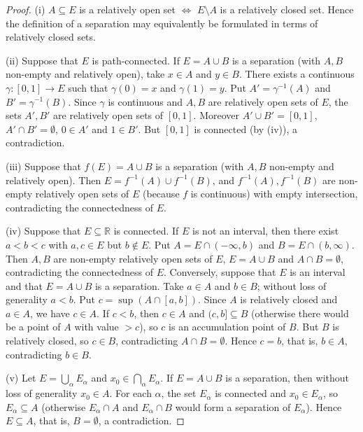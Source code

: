 \begin{proof}
(i) $A \subseteq E$ is a relatively open set $\iff$ $E \setminus A$ is a relatively closed set. Hence the definition of a separation may equivalently be formulated in terms of relatively closed sets.

(ii) Suppose that $E$ is path-connected. If $E = A \cup B$ is a separation (with $A, B$ non-empty and relatively open), take $x \in A$ and $y \in B$. There exists a continuous $\gamma: [0, 1] \to E$ such that $\gamma(0) = x$ and $\gamma(1) = y$. Put $A' = \gamma^{-1}(A)$ and $B' = \gamma^{-1}(B)$. Since $\gamma$ is continuous and $A, B$ are relatively open sets of $E$, the sets $A', B'$ are relatively open sets of $[0, 1]$. Moreover $A' \cup B' = [0, 1]$, $A' \cap B' = \emptyset$, $0 \in A'$ and $1 \in B'$. But $[0, 1]$ is connected (by (iv)), a contradiction.

(iii) Suppose that $f(E) = A \cup B$ is a separation (with $A, B$ non-empty and relatively open). Then $E = f^{-1}(A) \cup f^{-1}(B)$, and $f^{-1}(A), f^{-1}(B)$ are non-empty relatively open sets of $E$ (because $f$ is continuous) with empty intersection, contradicting the connectedness of $E$.

(iv) Suppose that $E \subseteq \mathbb{R}$ is connected. If $E$ is not an interval, then there exist $a < b < c$ with $a, c \in E$ but $b \notin E$. Put $A = E \cap (-\infty, b)$ and $B = E \cap (b, \infty)$. Then $A, B$ are non-empty relatively open sets of $E$, $E = A \cup B$ and $A \cap B = \emptyset$, contradicting the connectedness of $E$. Conversely, suppose that $E$ is an interval and that $E = A \cup B$ is a separation. Take $a \in A$ and $b \in B$; without loss of generality $a < b$. Put $c = \sup(A \cap [a, b])$. Since $A$ is relatively closed and $a \in A$, we have $c \in A$. If $c < b$, then $c \in A$ and $(c, b] \subseteq B$ (otherwise there would be a point of $A$ with value $> c$), so $c$ is an accumulation point of $B$. But $B$ is relatively closed, so $c \in B$, contradicting $A \cap B = \emptyset$. Hence $c = b$, that is, $b \in A$, contradicting $b \in B$.

(v) Let $E = \bigcup_\alpha E_\alpha$ and $x_0 \in \bigcap_\alpha E_\alpha$. If $E = A \cup B$ is a separation, then without loss of generality $x_0 \in A$. For each $\alpha$, the set $E_\alpha$ is connected and $x_0 \in E_\alpha$, so $E_\alpha \subseteq A$ (otherwise $E_\alpha \cap A$ and $E_\alpha \cap B$ would form a separation of $E_\alpha$). Hence $E \subseteq A$, that is, $B = \emptyset$, a contradiction.
\end{proof}

